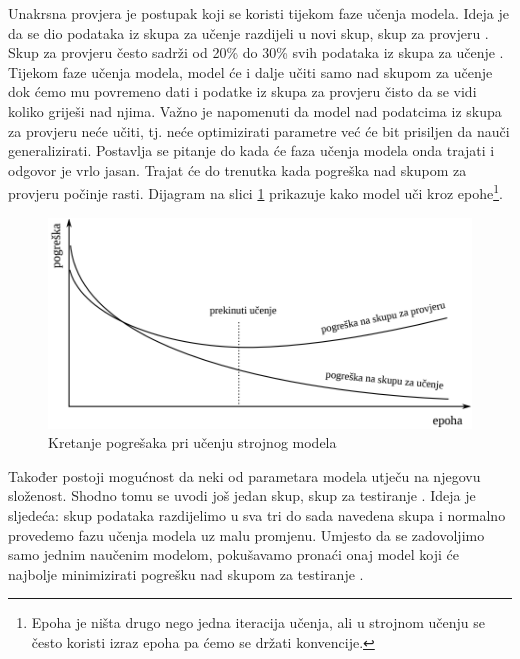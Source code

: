 \documentclass[times, utf8, zavrsni]{fer}
\begin{document}
\bigskip

Unakrsna provjera  je postupak koji se koristi tijekom faze učenja modela. Ideja je da se dio podataka iz skupa za učenje razdijeli u novi skup, skup za provjeru . Skup za provjeru često sadrži od 20\% do 30\% svih podataka iz skupa za učenje \citep{cupicML}. Tijekom faze učenja modela, model će i dalje učiti samo nad skupom za učenje dok ćemo mu povremeno dati i podatke iz skupa za provjeru čisto da se vidi koliko griješi nad njima. Važno je napomenuti da model nad podatcima iz skupa za provjeru neće učiti, tj. neće optimizirati parametre već će bit prisiljen da nauči generalizirati. Postavlja se pitanje do kada će faza učenja modela onda trajati i odgovor je vrlo jasan. Trajat će do trenutka kada pogreška nad skupom za provjeru počinje rasti. Dijagram na slici \ref{fig:cross-validation} prikazuje kako model uči kroz epohe\footnote{Epoha je ništa drugo nego jedna iteracija učenja, ali u strojnom učenju se često koristi izraz epoha pa ćemo se držati konvencije.}.

\begin{figure}[H]
    \centering
    \includegraphics[scale=0.5]{img/cross-validation.png}
    \caption[Caption for LOF]{Kretanje pogrešaka pri učenju strojnog modela\footnotemark}
    \label{fig:cross-validation}
\end{figure}

Također postoji mogućnost da neki od parametara modela utječu na njegovu složenost. Shodno tomu se uvodi još jedan skup, skup za testiranje . Ideja je sljedeća: skup podataka razdijelimo u sva tri do sada navedena skupa i normalno provedemo fazu učenja modela uz malu promjenu. Umjesto da se zadovoljimo samo jednim naučenim modelom, pokušavamo pronaći onaj model koji će najbolje minimizirati pogrešku nad skupom za testiranje \citep{cupicML}.
\end{document}
